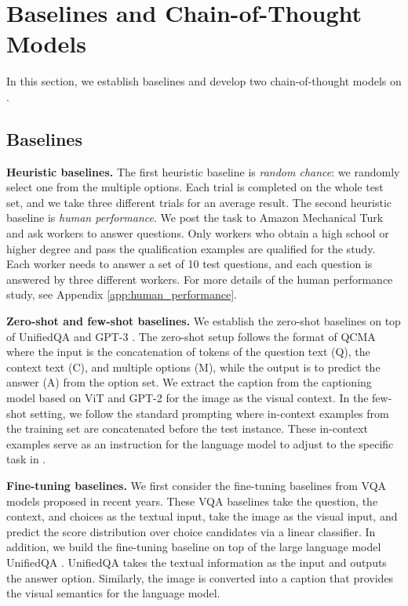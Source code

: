 \section{Baselines and Chain-of-Thought Models}
\label{sec:method}
In this section, we establish baselines and develop two chain-of-thought models on \name{}.

\subsection{Baselines}
\textbf{Heuristic baselines.} The first heuristic baseline is \textit{random chance}: we randomly select one from the multiple options. Each trial is completed on the whole test set, and we take three different trials for an average result. The second heuristic baseline is \textit{human performance}. We post the task to Amazon Mechanical Turk and ask workers to answer \name{} questions. Only workers who obtain a high school or higher degree and pass the qualification examples are qualified for the study. Each worker needs to answer a set of 10 test questions, and each question is answered by three different workers. For more details of the human performance study, see Appendix \ref{app:human_performance}.

\textbf{Zero-shot and few-shot baselines.} We establish the zero-shot baselines on top of UnifiedQA \cite{khashabi2020unifiedqa} and GPT-3 \cite{chen2020big}. The zero-shot setup follows the format of  QCMA where the input is the concatenation of tokens of the question text (Q), the context text (C), and multiple options (M), while the output is to predict the answer (A) from the option set. We extract the caption from the captioning model based on ViT \cite{dosovitskiy2020image} and GPT-2 \cite{radford2019language} for the image as the visual context. In the few-shot setting, we follow the standard prompting \cite {brown2020language} where in-context examples from the training set are concatenated before the test instance. These in-context examples serve as an instruction for the language model to adjust to the specific task in \name{}. 

\textbf{Fine-tuning baselines.} We first consider the fine-tuning baselines from VQA models \cite{Anderson2017up,Kim2018,yu2019mcan,gao2019dynamic,pmlr-v139-kim21k,lu2021iconqa,li2019visualbert} proposed in recent years. These VQA baselines take the question, the context, and choices as the textual input, take the image as the visual input, and predict the score distribution over choice candidates via a linear classifier. In addition, we build the fine-tuning baseline on top of the large language model UnifiedQA \cite{khashabi2020unifiedqa}. UnifiedQA takes the textual information as the input and outputs the answer option. Similarly, the image is converted into a caption that provides the visual semantics for the language model.

